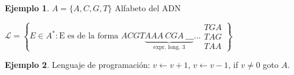 \documentclass[a4paper,11pt]{article}
\theoremstyle{definition}
\newtheorem{exap}{Ejemplo}[section]
\theoremstyle{remark}
\begin{document}
\begin{exap}
$A = \{A,C,G,T\}$ Alfabeto del ADN

$\mathcal L = \left\{ E \in A^* : \text{E es de la forma } 
ACGT\underbrace{AAA\ CGA\ \_\_\_}_{\text{expr. long. 3}}\dots \substack{TGA \\ TAG \\ TAA}\right\}$
\end{exap}

\begin{exap}
Lenguaje de programación: $v \leftarrow v + 1$, $v \leftarrow v - 1$, if $v \ne 0$ goto $A$.
\end{exap}
\end{document}
